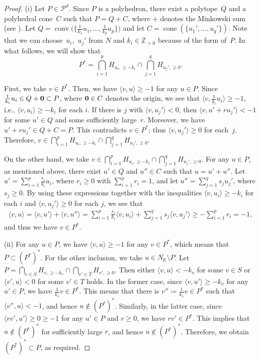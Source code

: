\documentclass[11pt]{article}
\numberwithin{equation}{section}
\numberwithin{equation}{section}
\numberwithin{figure}{section}
\numberwithin{table}{section}
\newcommand{\ZZ}{\mathbb{Z}}
\newcommand{\RR}{\mathbb{R}}
\newcommand{\calP}{\mathcal{P}}
\begin{document}
\begin{proof}(i) Let $P \in \calP^d$. Since $P$ is a polyhedron, there exist a polytope~$Q$ and a polyhedral cone~$C$ such that
$P=Q+C$, where $+$ denotes the Minkowski sum (see \cite[Corollary~7.1b]{Sch}).
Let $Q=\operatorname{conv}\big(\big\{\frac{1}{k_1}u_1,\dots,\frac{1}{k_p}u_p\big\}\big)$ and let $C=\operatorname{cone}(\{u_1',\dots,u_q'\})$.
Note that we can choose~$u_i$,~$u_j'$ from $N$ and $k_i \in \ZZ_{>0}$ because of the form of~$P$.
In what follows, we will show that
\begin{displaymath}
P^*=\bigcap_{i=1}^p H_{u_i,\geq -k_i} \cap \bigcap_{j=1}^qH_{u_j',\geq 0}.
\end{displaymath}

First, we take $v \in P^*$. Then, we have $\langle v,u \rangle \geq -1$ for any $u \in P$.
Since $\frac{1}{k_i}u_i \in Q+{\bf 0} \subset P$, where ${\bf 0} \in C$ denotes the origin,
we see that $\langle v, \frac{1}{k_i}u_i \rangle \geq -1$, i.e., $\langle v, u_i \rangle \geq -k_i$ for each $i$.
If there is $j$ with $\langle v,u_j' \rangle<0$, then $\langle v, u'+ru_j' \rangle < -1$ for some $u' \in Q$ and some sufficiently large~$r$.
Moreover, we have $u'+ru_j' \in Q+C=P$. This contradicts $v \in P^*$; thus $\langle v,u_j' \rangle\geq 0$ for each~$j$.
Therefore, $v \in \bigcap_{i=1}^p H_{u_i,\geq -k_i} \cap \bigcap_{j=1}^qH_{u_j',\geq 0}$.

On the other hand, we take $v \in \bigcap_{i=1}^p H_{u_i,\geq -k_i} \cap \bigcap_{j=1}^qH_{u_j',\geq 0}$.
For any $u \in P$, as mentioned above, there exist $u' \in Q$ and $u'' \in C$ such that $u=u'+u''$.
Let $u'=\sum_{i=1}^p \frac{r_i}{k_i}u_i$, where $r_i \geq 0$ with $\sum_{i=1}^pr_i=1$, and let $u''=\sum_{j=1}^q s_ju_j'$, where $s_j \geq 0$.
By using these expressions together with the inequalities $\langle v,u_i \rangle \geq -k_i$ for each $i$ and $\langle v,u_j' \rangle \geq 0$ for each $j$, we see that
\begin{align*}
\langle v,u \rangle = \langle v,u' \rangle+\langle v,u'' \rangle =
\sum_{i=1}^p \frac{r_i}{k_i}\langle v,u_i \rangle+\sum_{j=1}^q s_j\langle v,u_j' \rangle \geq -\sum_{i=1}^pr_i=-1,
\end{align*}
and thus we have $v \in P^*$.

(ii) For any $u \in P$, we have $\langle v,u\rangle\geq -1$ for any $v \in P^*$, which means that $P \subset (P^*)^*$.
For the other inclusion, we take $u \in N_\RR \setminus P$.
Let $P=\bigcap_{v \in S} H_{v,\geq -k_v} \cap \bigcap_{v' \in T}H_{v',\geq 0}$.
Then either $\langle v,u \rangle <-k_v$ for some $v \in S$ or $\langle v',u \rangle < 0$ for some $v' \in T$ holds.
In the former case, since $\langle v,u' \rangle \geq -k_v$ for any $u' \in P$, we have $\frac{1}{k_v}v \in P^*$.
This means that there is $v''\coloneqq\frac{1}{k_v}v \in P^*$ such that $\langle v'',u \rangle<-1$, and hence $u \not\in (P^*)^*$.
Similarly, in the latter case, since $\langle rv',u' \rangle \geq 0 \geq -1$ for any $u' \in P$ and $r \geq 0$, we have $rv' \in P^*$.
This implies that $u \not\in (P^*)^*$ for sufficiently large $r$, and hence $u \not\in (P^*)^*$. Therefore, we obtain $(P^*)^* \subset P$, as required.
\end{proof}
\end{document}
